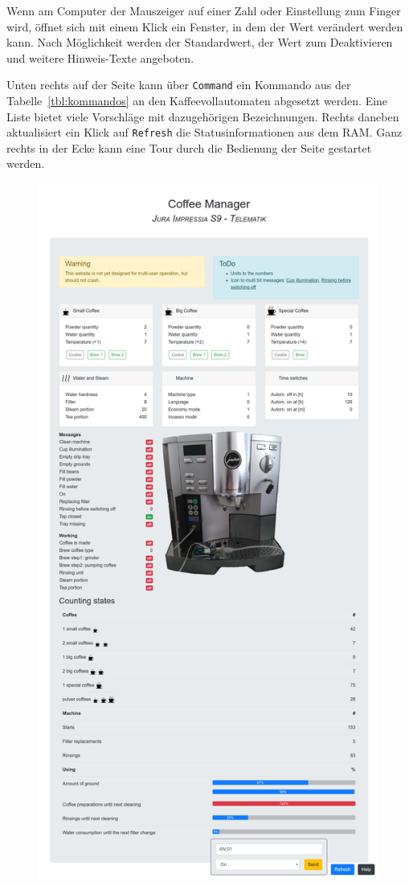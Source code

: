 Wenn am Computer der Mauszeiger auf einer Zahl oder Einstellung zum Finger wird, öffnet sich mit einem Klick ein Fenster, in dem der Wert verändert werden kann.
Nach Möglichkeit werden der Standardwert, der Wert zum Deaktivieren und weitere Hinweis-Texte angeboten.

Unten rechts auf der Seite kann über \texttt{Command} ein Kommando aus der Tabelle~\ref{tbl:kommandos} an den Kaffeevollautomaten abgesetzt werden.
Eine Liste bietet viele Vorschläge mit dazugehörigen Bezeichnungen.
Rechts daneben aktualisiert ein Klick auf \texttt{Refresh} die Statusinformationen aus dem \ac{RAM}.
Ganz rechts in der Ecke kann eine Tour durch die Bedienung der Seite gestartet werden.

\begin{figure}
  \begin{center}
    \includegraphics[scale=0.25]{images/chapter_4/Webseite}

\end{center}
\end{figure}
